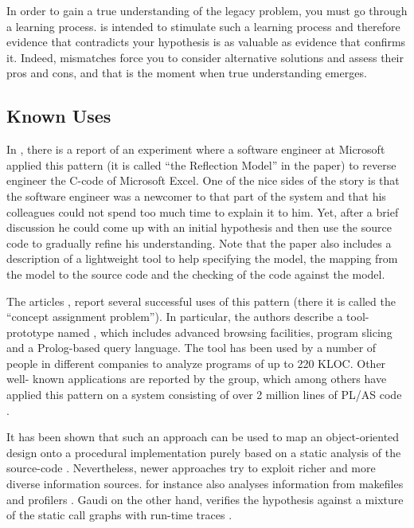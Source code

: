 \documentclass[a4paper,10pt,twoside]{book}
\begin{document}
In order to gain a true understanding of the legacy problem, you must go through a learning 
process.  is intended to stimulate 
such a learning process and therefore evidence that contradicts your hypothesis is as 
valuable as evidence that confirms it. Indeed, mismatches force you to consider alternative 
solutions and assess their pros and cons, and that is the moment when true understanding 
emerges.

\subsection*{Known Uses}

In \cite{Murp97a}, there is a report of an experiment where a software engineer at 
Microsoft applied this pattern (it is called ``the Reflection Model'' in the paper) to 
reverse engineer the C-code of Microsoft Excel. One of the nice sides of the story is that 
the software engineer was a newcomer to that part of the system and that his colleagues 
could not spend too much time to explain it to him. Yet, after a brief discussion he could 
come up with an initial hypothesis and then use the source code to gradually refine his 
understanding. Note that the paper also includes a description of a lightweight tool to 
help specifying the model, the mapping from the model to the source code and the checking 
of the code against the model.

The articles \cite{Bigg89c} \cite{Bigg93a} \cite{Bigg94a}, report several successful uses 
of this pattern (there it is called the ``concept assignment problem''). In particular, the 
authors describe a tool-prototype named , which includes advanced browsing 
facilities, program slicing and a Prolog-based query language. The tool has been used by a 
number of people in different companies to analyze programs of up to 220 KLOC. Other well-
known applications are reported by the  group, which among others have applied 
this pattern on a system consisting of over 2 million lines of PL/AS code \cite{Wong95a}.

It has been shown that such an approach can be used to map an object-oriented design onto a 
procedural implementation purely based on a static analysis of the source-code 
\cite{Gall99a} \cite{Weid98a}. Nevertheless, newer approaches try to exploit richer and 
more diverse information sources.  for instance also analyses information from 
makefiles and profilers \cite{Bass98a} \cite{Kazm98b} \cite{Kazm99a}. Gaudi on the other 
hand, verifies the hypothesis against a mixture of the static call graphs with run-time 
traces \cite{Rich99a}.
\end{document}
